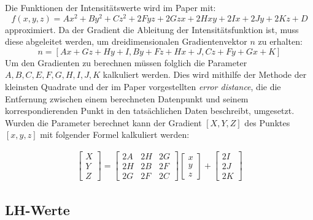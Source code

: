 Die Funktionen der Intensitätswerte wird im Paper mit:
\begin{equation}
	f(x,y,z) = Ax^{2}+By^{2}+Cz^{2}+2Fyz+2Gzx+2Hxy+2Ix+2Jy+2Kz+D
\end{equation}
approximiert.
\newline
Da der Gradient die Ableitung der Intensitätsfunktion ist, muss diese abgeleitet werden, um dreidimensionalen Gradientenvektor $n$ zu erhalten:
\begin{equation}
	n = [Ax+Gz+Hy+I, By+Fz+Hx+J, Cz + Fy + Gx + K]
\end{equation}
Um den Gradienten zu berechnen müssen folglich die Parameter $A,B,C,E,F,G,H,I,J,K$ kalkuliert werden. Dies wird mithilfe der Methode der kleinsten Quadrate und der im Paper vorgestellten \textit{error distance}, die die Entfernung zwischen einem berechneten Datenpunkt und seinem korrespondierenden Punkt in den tatsächlichen Daten beschreibt, umgesetzt.
\newline
Wurden die Parameter berechnet kann der Gradient $[X, Y, Z]$ des Punktes $[x, y, z]$ mit folgender Formel kalkuliert werden:

\begin{align}
\begin{bmatrix}
           X \\
           Y \\
           Z
         \end{bmatrix}    
 	= \begin{bmatrix}
           2A & 2H & 2G \\
           2H & 2B & 2F \\
           2G & 2F & 2C
         \end{bmatrix}
         \begin{bmatrix}
           x \\
           y \\
           z
         \end{bmatrix}
	+\begin{bmatrix}
           2I \\
           2J \\
           2K
         \end{bmatrix}
  \end{align}




\subsection{LH-Werte}


